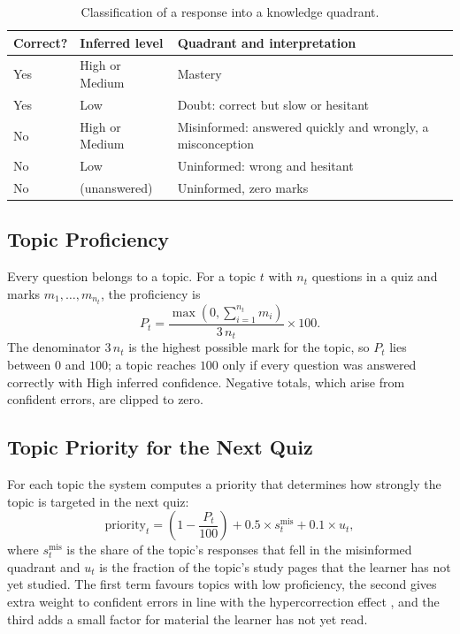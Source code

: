 \documentclass[12pt,a4paper,oneside]{report}
\begin{document}
\begin{table}[H]
\centering
\caption{Classification of a response into a knowledge quadrant.}
\label{tab:classify}
\begin{tabularx}{\textwidth}{@{}llX@{}}
\toprule
\textbf{Correct?} & \textbf{Inferred level} & \textbf{Quadrant and interpretation} \\
\midrule
Yes & High or Medium & Mastery \\
Yes & Low            & Doubt: correct but slow or hesitant \\
No  & High or Medium & Misinformed: answered quickly and wrongly, a misconception \\
No  & Low            & Uninformed: wrong and hesitant \\
No  & (unanswered)   & Uninformed, zero marks \\
\bottomrule
\end{tabularx}
\end{table}

\subsection{Topic Proficiency}

Every question belongs to a topic. For a topic $t$ with $n_t$ questions in
a quiz and marks $m_1, \dots, m_{n_t}$, the proficiency is
\begin{equation}
  P_t = \frac{\max\!\left(0, \sum_{i=1}^{n_t} m_i\right)}{3\,n_t} \times 100 .
  \label{eq:proficiency}
\end{equation}
The denominator $3\,n_t$ is the highest possible mark for the topic, so
$P_t$ lies between $0$ and $100$; a topic reaches $100$ only if every
question was answered correctly with High inferred confidence. Negative
totals, which arise from confident errors, are clipped to zero.

\subsection{Topic Priority for the Next Quiz}\label{sec:priority}

For each topic the system computes a priority that determines how strongly
the topic is targeted in the next quiz:
\begin{equation}
  \mathrm{priority}_t = \left(1 - \frac{P_t}{100}\right)
    + 0.5 \times s^{\mathrm{mis}}_t
    + 0.1 \times u_t ,
  \label{eq:priority}
\end{equation}
where $s^{\mathrm{mis}}_t$ is the share of the topic's responses that fell
in the misinformed quadrant and $u_t$ is the fraction of the topic's study
pages that the learner has not yet studied. The first term favours topics
with low proficiency, the second gives extra weight to confident errors in
line with the hypercorrection effect \cite{butterfield2001}, and the third
adds a small factor for material the learner has not yet read.
\end{document}
